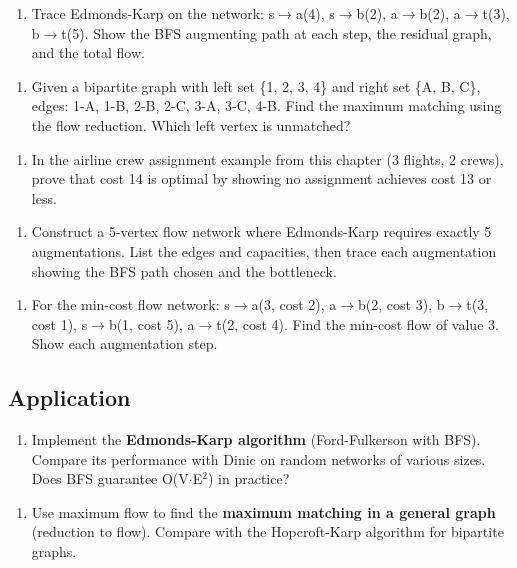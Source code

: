 \begin{enumerate}
\item Trace Edmonds-Karp on the network: s$\to $a(4), s$\to $b(2), a$\to $b(2), a$\to $t(3), b$\to $t(5). Show the BFS augmenting path at each step, the residual graph, and the total flow.
\end{enumerate}

\begin{enumerate}
\item Given a bipartite graph with left set \{1, 2, 3, 4\} and right set \{A, B, C\}, edges: 1-A, 1-B, 2-B, 2-C, 3-A, 3-C, 4-B. Find the maximum matching using the flow reduction. Which left vertex is unmatched?
\end{enumerate}

\begin{enumerate}
\item In the airline crew assignment example from this chapter (3 flights, 2 crews), prove that cost 14 is optimal by showing no assignment achieves cost 13 or less.
\end{enumerate}

\begin{enumerate}
\item Construct a 5-vertex flow network where Edmonds-Karp requires exactly 5 augmentations. List the edges and capacities, then trace each augmentation showing the BFS path chosen and the bottleneck.
\end{enumerate}

\begin{enumerate}
\item For the min-cost flow network: s$\to $a(3, cost 2), a$\to $b(2, cost 3), b$\to $t(3, cost 1), s$\to $b(1, cost 5), a$\to $t(2, cost 4). Find the min-cost flow of value 3. Show each augmentation step.
\end{enumerate}

\subsection{Application}

\begin{enumerate}
\item Implement the \textbf{Edmonds-Karp algorithm} (Ford-Fulkerson with BFS). Compare its performance with Dinic on random networks of various sizes. Does BFS guarantee O(V$\cdot $E$^{2}$) in practice?
\end{enumerate}

\begin{enumerate}
\item Use maximum flow to find the \textbf{maximum matching in a general graph} (reduction to flow). Compare with the Hopcroft-Karp algorithm for bipartite graphs.
\end{enumerate}

